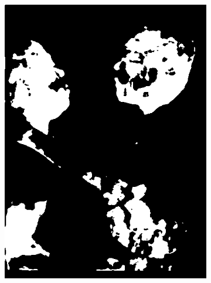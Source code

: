 \begin{figure}[h]
{\begin{subfigure}[b]{0.23\textwidth}
         \includegraphics[width=\textwidth]{images/results/cross_st/mike_light_dark_skinny_24.png}
         \caption{}
     \end{subfigure}
    \hfill
     \hfill
     \begin{subfigure}[b]{0.23\textwidth}
         \centering

\end{subfigure}}
\end{figure}
